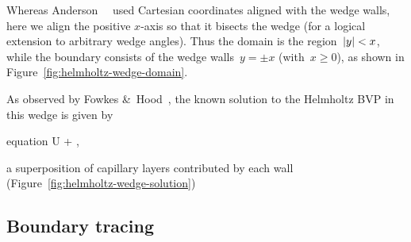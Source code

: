 Whereas Anderson~\etal~\cite{anderson-2007-boundary-tracing-ii-applications}
used Cartesian coordinates aligned with the wedge walls,
here we align the positive $x$-axis so that it bisects the wedge
(for a logical extension to arbitrary wedge angles).
Thus the domain is the region~$\lvert y\rvert < x$,
while the boundary consists of the wedge walls~$y = \pm x$ (with~$x \ge 0$),
as shown in Figure~\ref{fig:helmholtz-wedge-domain}.

As observed by Fowkes \&~Hood~\cite{fowkes-1998-surface-tension-effects-wedge},
the known solution to the Helmholtz BVP in this wedge is given by
\begin{important}{equation}
  U \ideq \exp {} + \exp {},
  \label{eq:scaled-helmholtz-solution}
\end{important}
a superposition of capillary layers contributed by each wall
(Figure~\ref{fig:helmholtz-wedge-solution})

\subsection{Boundary tracing}
\label{sec:moderate.linearised.tracing}

